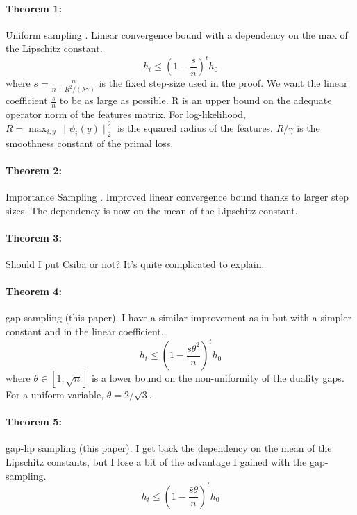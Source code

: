 \documentclass{article}
\DeclareMathOperator{\1}{\mathbb{1}}
\begin{document}
\paragraph{Theorem 1:} Uniform sampling \cite{shalev-shwartz_accelerated_2013-1}. 
Linear convergence bound with a dependency on the max of the Lipschitz constant.
\begin{equation}
	h_t \leq (1-\frac{s}{n})^t  h_0
\end{equation}
where $ s = \frac{n}{n+R^2/(\lambda \gamma)} $ is the fixed step-size used in the proof. We want the linear coefficient $\frac{s}{n}$ to be as large as possible. R is an upper bound on the adequate operator norm of the features matrix. For log-likelihood, $R = \max_{i,y} \| \psi_i(y) \|_2^2 $ is the squared radius of the features. $R/\gamma$ is the smoothness constant of the primal loss.

\paragraph{Theorem 2:} Importance Sampling \cite{richtarik}. 
Improved linear convergence bound thanks to larger step sizes. The dependency is now on the mean of the Lipschitz constant.

\paragraph{Theorem 3:} Should I put Csiba or not? It's quite complicated to explain.

\paragraph{Theorem 4:} gap sampling (this paper). 
I have a similar improvement as in \cite{osokin2016minding} but with a simpler constant and in the linear coefficient. 
\begin{equation}
	h_t \leq (1-\frac{s \theta^2}{n})^t  h_0
\end{equation}
where $\theta \in [1,\sqrt n] $ is a lower bound on the non-uniformity of the duality gaps.  For a uniform variable, $\theta = 2 / \sqrt 3 $.

\paragraph{Theorem 5:} gap-lip sampling (this paper).
I get back the dependency on the mean of the Lipschitz constants, but I lose a bit of the advantage I gained with the gap-sampling.
\begin{equation}
	h_t \leq (1-\frac{\bar s \theta}{n})^t  h_0
\end{equation}


\printbibliography
\end{document}
